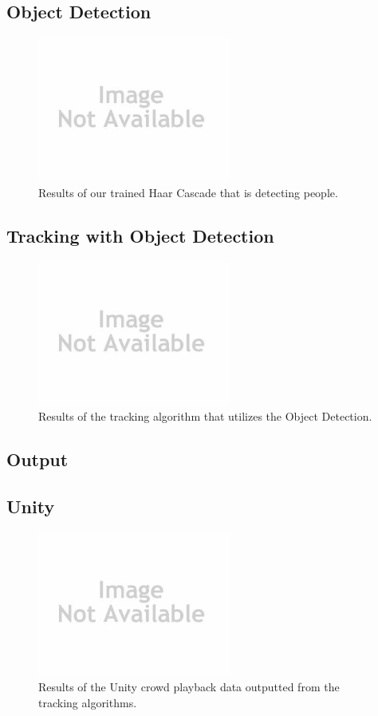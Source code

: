 \documentclass[conference]{IEEEtran}
\begin{document}
\subsection{Object Detection}

\begin{figure}[!t]
\centering
\includegraphics[width=2.5in]{noImage.jpg}
\caption{Results of our trained Haar Cascade that is detecting people.}
\label{Object_Detection}
\end{figure}

\subsection{Tracking with Object Detection}

\begin{figure}[!t]
\centering
\includegraphics[width=2.5in]{noImage.jpg}
\caption{Results of the tracking algorithm that utilizes the Object Detection.}
\label{Tracking_Object_Detection}
\end{figure}

\subsection{Output}

\subsection{Unity}

\begin{figure}[!t]
\centering
\includegraphics[width=2.5in]{noImage.jpg}
\caption{Results of the Unity crowd playback data outputted from the tracking algorithms.}
\label{Unity}
\end{figure}
\end{document}
